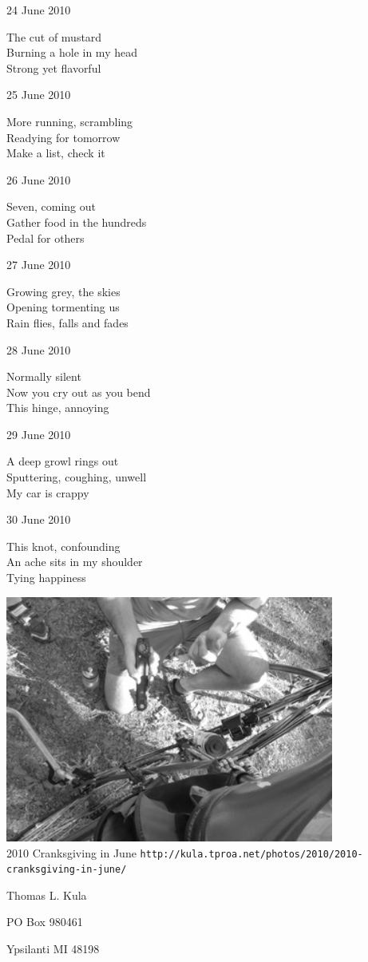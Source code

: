 \documentclass[12pt]{article}
\begin{document}
24 June 2010

The cut of mustard \\
Burning a hole in my head \\
Strong yet flavorful

25 June 2010

More running, scrambling \\
Readying for tomorrow \\
Make a list, check it

26 June 2010

Seven, coming out \\
Gather food in the hundreds \\
Pedal for others

27 June 2010

Growing grey, the skies \\
Opening tormenting us \\
Rain flies, falls and fades

28 June 2010

Normally silent \\
Now you cry out as you bend \\
This hinge, annoying

29 June 2010

A deep growl rings out \\
Sputtering, coughing, unwell \\
My car is crappy

30 June 2010

This knot, confounding \\
An ache sits in my shoulder \\
Tying happiness


\newpage

\begin{center}
\includegraphics[width=4.25in]{cij.jpg} \\[1cm]

2010 Cranksgiving in June
\small{{\tt http://kula.tproa.net/photos/2010/2010-cranksgiving-in-june/ }}

\end{center}

\newpage

\thispagestyle{empty}
\vspace*{14cm}
\begin{sideways}
\Large{Thomas L. Kula}
\end{sideways}
\begin{sideways}
\Large{PO Box 980461}
\end{sideways}
\begin{sideways}
\Large{Ypsilanti MI 48198}
\end{sideways}
\end{document}
